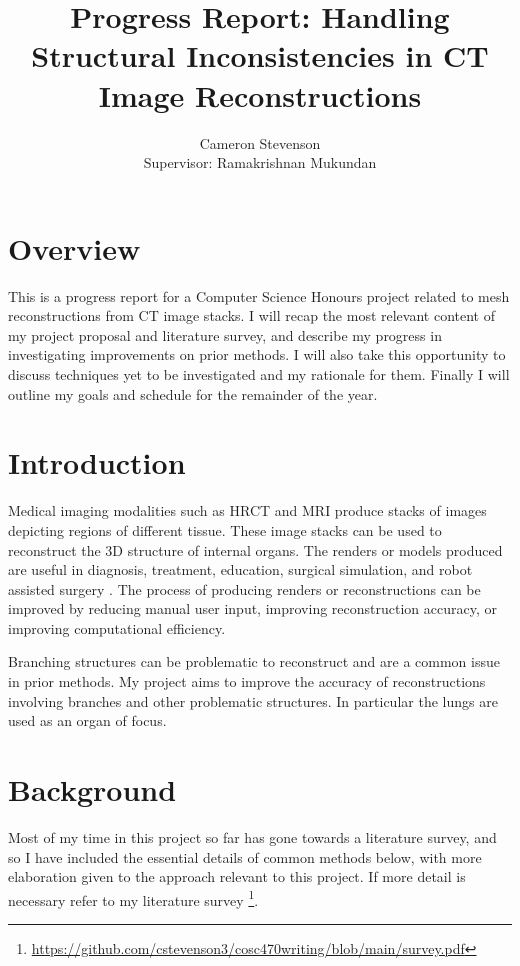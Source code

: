 \documentclass[10pt]{article}
\title{Progress Report: Handling Structural Inconsistencies in CT Image Reconstructions}
\author{Cameron Stevenson\\[0.5cm]{\small Supervisor: Ramakrishnan Mukundan}}
\begin{document}
\maketitle

\section{Overview}

This is a progress report for a Computer Science Honours project related to mesh reconstructions from CT image stacks. I will recap the most relevant content of my project proposal and literature survey, and describe my progress in investigating improvements on prior methods. I will also take this opportunity to discuss techniques yet to be investigated and my rationale for them. Finally I will outline my goals and schedule for the remainder of the year.

\section{Introduction}

Medical imaging modalities such as HRCT and MRI produce stacks of images depicting regions of different tissue. These image stacks can be used to reconstruct the 3D structure of internal organs. The renders or models produced are useful in diagnosis, treatment, education, surgical simulation, and robot assisted surgery \cite{mackay2019robust, mukundan2016reconstruction}. The process of producing renders or reconstructions can be improved by reducing manual user input, improving reconstruction accuracy, or improving computational efficiency.

Branching structures can be problematic to reconstruct and are a common issue in prior methods. My project aims to improve the accuracy of reconstructions involving branches and other problematic structures. In particular the lungs are used as an organ of focus. 

\section{Background}

Most of my time in this project so far has gone towards a literature survey, and so I have included the essential details of common methods below, with more elaboration given to the approach relevant to this project. If more detail is necessary refer to my literature survey \footnote{\url{https://github.com/cstevenson3/cosc470writing/blob/main/survey.pdf}}.
\end{document}
